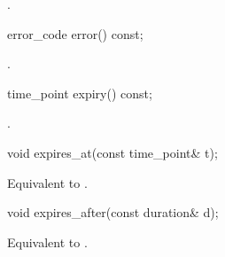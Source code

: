 \begin{itemdescr}
\pnum
\returns {}.
\end{itemdescr}

\begin{itemdecl}
error_code error() const;
\end{itemdecl}

\begin{itemdescr}
\pnum
\returns {}.
\end{itemdescr}

\begin{itemdecl}
time_point expiry() const;
\end{itemdecl}

\begin{itemdescr}
\pnum
\returns {}.
\end{itemdescr}

\begin{itemdecl}
void expires_at(const time_point& t);
\end{itemdecl}

\begin{itemdescr}
\pnum
\effects Equivalent to .
\end{itemdescr}

\begin{itemdecl}
void expires_after(const duration& d);
\end{itemdecl}

\begin{itemdescr}
\pnum
\effects Equivalent to .
\end{itemdescr}



